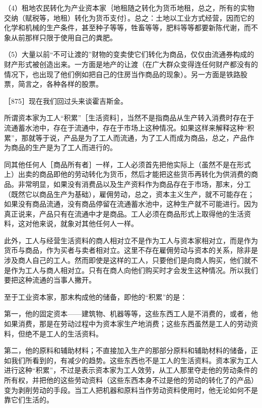 （4）租地农民转化为产业资本家｛地租随之转化为货币地租，总之，所有的实物交纳（赋税等，地租）转化为货币支付｝。总之：土地以工业方式经营，因而它的化学和机械的生产条件，甚至种子等等，牲畜等等，肥料等等都要新陈代谢，而不象从前那样只限于使用自己的粪肥。

（5）大量以前“不可让渡的”财物的变卖使它们转化为商品，仅仅由流通券构成的财产形式被创造出来。一方面是地产的让渡（在广大群众变得连任何财产都没有的情况下，也出现了他们例如把自己的住房当作商品的现象）。另一方面是铁路股票，简言之，各种各样的股票。


［875］现在我们回过头来谈霍吉斯金。

所谓资本家为工人“积累”［生活资料］，当然不是指商品从生产转入消费时存在于流通蓄水池中，存在于流通中，存在于市场上这种情况。如果这样来解释这种“积累”，那就等于说，产品是为了工人而流通，为了工人而成为商品，总之，产品作为商品的生产是为了工人而进行的。

同其他任何人［商品所有者］一样，工人必须首先把他实际上（虽然不是在形式上）出卖的商品即他的劳动转化为货币，然后才能把这些货币再转化为供消费的商品。非常明显，如果没有消费品以及生产资料作为商品存在于市场，那末，分工（既然它以商品生产为基础），雇佣劳动，总之，资本主义生产，就不可能存在；如果没有商品流通，没有商品停留在流通蓄水池中，这种生产就不可能进行。因为真正说来，产品只有在流通中才是商品。工人必须在商品形式上取得他的生活资料，这对他来说，就象对其他任何人一样。

此外，工人与经营生活资料的商人相对立不是作为工人与资本家相对立，而是作为货币与商品，作为买者与卖者相对立。这里不存在雇佣劳动与资本的关系，除非是涉及商人自己的工人。然而即使是这样的工人，只要他们是向商人购买，他们就不是作为工人与商人相对立。只有在商人向他们购买时才会发生这种情况。所以我们要把这种流通的当事人撇开。

至于工业资本家，那末构成他的储备，即他的“积累”的是：

第一，他的固定资本——建筑物、机器等等，这些东西工人是不消费的，或者，他如果消费，那是在劳动过程中为资本家生产地消费；这些东西虽然是工人的劳动资料，但绝不是工人的生活资料。

第二，他的原料和辅助材料；不直接加入生产的那部分原料和辅助材料的储备，正如我们所看到的，有减少的趋势。这些东西也不是工人的生活资料。资本家为工人进行这种“积累”，不过是表示资本家为工人效劳，从工人那里夺走他的劳动条件的所有权，并把他的这些劳动资料（这些东西本身不过是他的劳动的转化了的产品）变为剥削劳动的手段。当工人把机器和原料当作劳动资料使用时，他无论如何不是靠它们生活的。

